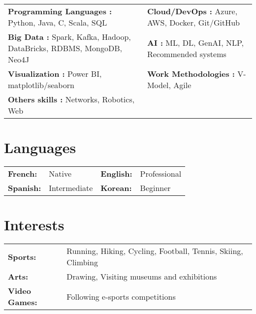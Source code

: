 \documentclass[letterpaper,10pt]{article}
\begin{document}
{\small
    \begin{tabularx}{1.1\textwidth}{@{}>{\raggedright\arraybackslash}X >{\raggedright\arraybackslash}X@{}}
	\textbf{Programming Languages :} Python, Java, C, Scala, SQL& \textbf{Cloud/DevOps :} Azure, AWS, Docker, Git/GitHub\\
	\textbf{Big Data :} Spark, Kafka, Hadoop, DataBricks, RDBMS, MongoDB, Neo4J& \textbf{AI :} ML, DL, GenAI, NLP, Recommended systems\\
	\textbf{Visualization :} Power BI, matplotlib/seaborn& \textbf{Work Methodologies :} V-Model, Agile \\
	\textbf{Others skills :} Networks, Robotics, Web 
    \end{tabularx}
    \vspace{-12pt}
}

\section{Languages}
\begin{itemize}[leftmargin=0.15in, label={}]
  \small{\item{
    \begin{tabularx}{\linewidth}{@{}lX lX@{}}
      \textbf{French: } & Native & \textbf{English: } & Professional \\
      \textbf{Spanish: } & Intermediate & \textbf{Korean: } & Beginner \\
    \end{tabularx}
  }}
\end{itemize}


\section{Interests}
\begin{itemize}[leftmargin=0.15in, label={}]
  \small{\item{
    \begin{tabular}{@{}l@{\hspace{1cm}}l}
        \textbf{Sports:} & Running, Hiking, Cycling, Football, Tennis, Skiing, Climbing \\
        \textbf{Arts:} & Drawing, Visiting museums and exhibitions \\
        \textbf{Video Games:} & Following e-sports competitions
    \end{tabular}
  }}
\end{itemize}
\end{document}
